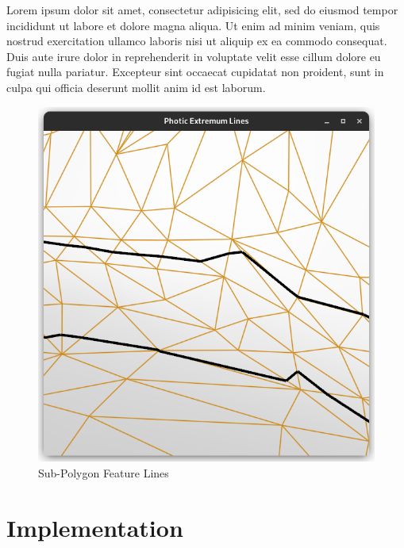 \documentclass[9pt,fleqn,twoside,twocolumn]{stdglobal}
\begin{document}
  \begin{tcolorbox}[%
    colframe=black,
    colbacktitle=white,
    coltitle=black,
    colback=mathdefback,
    attach boxed title to top center={yshift=-2mm},
    enhanced,
    titlerule=0.1pt,
    boxrule=0.5pt,
    arc=5pt,
    breakable,
    width=\linewidth,
    title=Algorithm
  ]
    Lorem ipsum dolor sit amet, consectetur adipisicing elit, sed do eiusmod
    tempor incididunt ut labore et dolore magna aliqua. Ut enim ad minim veniam,
    quis nostrud exercitation ullamco laboris nisi ut aliquip ex ea commodo
    consequat. Duis aute irure dolor in reprehenderit in voluptate velit esse
    cillum dolore eu fugiat nulla pariatur. Excepteur sint occaecat cupidatat non
    proident, sunt in culpa qui officia deserunt mollit anim id est laborum.
  \end{tcolorbox}

  \begin{figure}
    \centering
    \includegraphics[width=\linewidth,trim={15px 15 15 50},clip]{images/subpolygon-lines.png}
    \caption{Sub-Polygon Feature Lines}
  \end{figure}

\section{Implementation}
\end{document}
